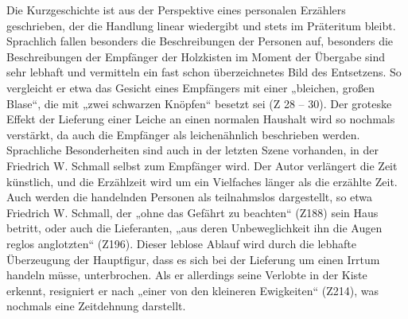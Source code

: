 Die Kurzgeschichte ist aus der Perspektive eines personalen Erzählers geschrieben, der die Handlung linear wiedergibt und stets im Präteritum bleibt. Sprachlich fallen besonders die Beschreibungen der Personen auf, besonders die Beschreibungen der Empfänger der Holzkisten im Moment der Übergabe sind sehr lebhaft und vermitteln ein fast schon überzeichnetes Bild des Entsetzens. So vergleicht er etwa das Gesicht eines Empfängers mit einer „bleichen, großen Blase“, die mit „zwei schwarzen Knöpfen“ besetzt sei (Z 28 – 30). Der groteske Effekt der Lieferung einer Leiche an einen normalen Haushalt wird so nochmals verstärkt, da auch die Empfänger als leichenähnlich beschrieben werden.  Sprachliche Besonderheiten sind auch in der letzten Szene vorhanden, in der Friedrich W. Schmall selbst zum Empfänger wird.  Der Autor verlängert die Zeit künstlich, und die Erzählzeit wird um ein Vielfaches länger als die erzählte Zeit. Auch werden die handelnden Personen als teilnahmslos dargestellt, so etwa Friedrich W. Schmall, der „ohne das Gefährt zu beachten“ (Z188) sein Haus betritt, oder auch die Lieferanten, „aus deren Unbeweglichkeit ihn die Augen reglos anglotzten“ (Z196). Dieser leblose Ablauf wird durch die lebhafte Überzeugung der Hauptfigur, dass es sich bei der Lieferung um einen Irrtum handeln müsse, unterbrochen. Als er allerdings seine Verlobte in der Kiste erkennt, resigniert er nach „einer von den kleineren Ewigkeiten“ (Z214), was nochmals eine Zeitdehnung darstellt.  

